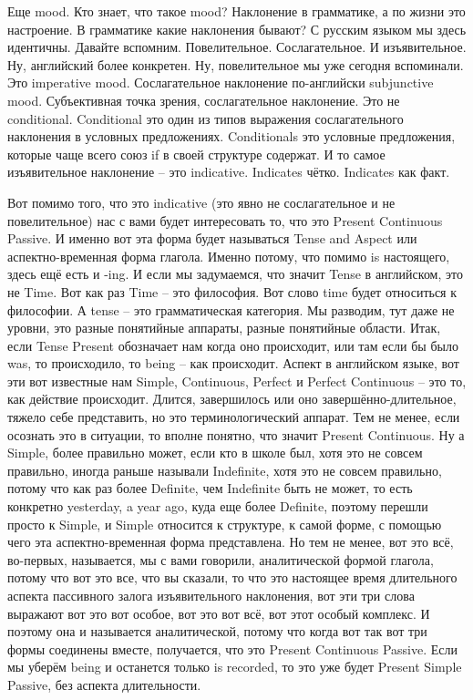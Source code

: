 \documentclass[main.tex]{subfiles}
\begin{document}
Еще mood.
Кто знает, что такое mood? Наклонение в грамматике, а по жизни это настроение.
В грамматике какие наклонения бывают?
С русским языком мы здесь идентичны.
Давайте вспомним.
Повелительное.
Сослагательное.
И изъявительное.
Ну, английский более конкретен.
Ну, повелительное мы уже сегодня вспоминали.
Это imperative mood.
Сослагательное наклонение по-английски subjunctive mood.
Субъективная точка зрения, сослагательное наклонение.
Это не conditional.
Conditional это один из типов выражения сослагательного наклонения в условных предложениях.
Conditionals это условные предложения, которые чаще всего союз if в своей структуре содержат.
И то самое изъявительное наклонение -- это indicative.
Indicates чётко.
Indicates как факт.

Вот помимо того, что это indicative (это явно не сослагательное и не повелительное) нас с вами будет интересовать то, что это Present Continuous Passive.
И именно вот эта форма будет называться Tense and Aspect или аспектно-временная форма глагола.
Именно потому, что помимо is настоящего, здесь ещё есть и -ing.
И если мы задумаемся, что значит Tense в английском, это не Time.
Вот как раз Time -- это философия.
Вот слово time будет относиться к философии.
А tense -- это грамматическая категория.
Мы разводим, тут даже не уровни, это разные понятийные аппараты, разные понятийные области.
Итак, если Tense Present обозначает нам когда оно происходит, или там если бы было was, то происходило, то being -- как происходит.
Аспект в английском языке, вот эти вот известные нам Simple, Continuous, Perfect и Perfect Continuous -- это то, как действие происходит.
Длится, завершилось или оно завершённо-длительное, тяжело себе представить, но это терминологический аппарат.
Тем не менее, если осознать это в ситуации, то вполне понятно, что значит Present Continuous.
Ну а Simple, более правильно может, если кто в школе был, хотя это не совсем правильно, иногда раньше называли Indefinite, хотя это не совсем правильно, потому что как раз более Definite, чем Indefinite быть не может, то есть конкретно yesterday, a year ago, куда еще более Definite, поэтому перешли просто к Simple, и Simple относится к структуре, к самой форме, с помощью чего эта аспектно-временная форма представлена.
Но тем не менее, вот это всё, во-первых, называется, мы с вами говорили, аналитической формой глагола, потому что вот это все, что вы сказали, то что это настоящее время длительного аспекта пассивного залога изъявительного наклонения, вот эти три слова выражают вот это вот особое, вот это вот всё, вот этот особый комплекс.
И поэтому она и называется аналитической, потому что когда вот так вот три формы соединены вместе, получается, что это Present Continuous Passive.
Если мы уберём being и останется только is recorded, то это уже будет Present Simple Passive, без аспекта длительности.
\end{document}
